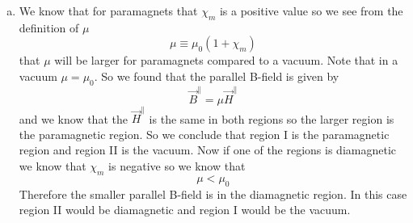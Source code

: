 \documentclass[11pt]{article}
\numberwithin{equation}{section}
\begin{document}
\begin{enumerate}[(a)]
\item
We know that for paramagnets that $\chi_m$ is a positive value so we see from the definition of $\mu$
$$\mu\equiv\mu_0(1+\chi_m)$$
that $\mu$ will be larger for paramagnets compared to a vacuum. Note that in a vacuum $\mu=\mu_0$. So we found that the parallel B-field is given by
$$\vec{B}^{\parallel} = \mu\vec{H}^{\parallel}$$
and we know that the $\vec{H}^{\parallel}$ is the same in both regions so the larger region is the paramagnetic region. So we conclude that region I is the paramagnetic region and region II is the vacuum. Now if one of the regions is diamagnetic we know that $\chi_m$ is negative so we know that
$$\mu<\mu_0$$
Therefore the smaller parallel B-field is in the diamagnetic region. In this case region II would be diamagnetic and region I would be the vacuum.
\end{enumerate}
\end{document}
